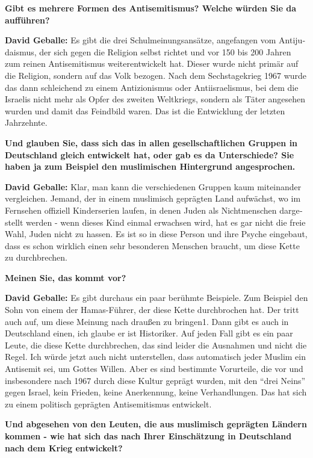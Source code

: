 \begin{otherlanguage}{ngerman}
\textbf{Gibt es mehrere Formen des Antisemitismus? Welche würden Sie da aufführen?}

\textbf{David Geballe:} Es gibt die drei Schulmeinungsansätze, angefangen vom Antijudaismus, der sich gegen die Religion selbst richtet und vor 150 bis 200 Jahren zum reinen Antisemitismus weiterentwickelt hat. Dieser wurde nicht primär auf die Religion, sondern auf das Volk bezogen. Nach dem Sechstagekrieg 1967 wurde das dann schleichend zu einem Antizionismus oder Antiisraelismus, bei dem die Israelis nicht mehr als Opfer des zweiten Weltkriegs, sondern als Täter angesehen wurden und damit das Feindbild waren. Das ist die Entwicklung der letzten Jahrzehnte. 

\textbf{Und glauben Sie, dass sich das in allen gesellschaftlichen Gruppen in Deutschland gleich entwickelt hat, oder gab es da Unterschiede? Sie haben ja zum Beispiel den muslimischen Hintergrund angesprochen.}

\textbf{David Geballe:} Klar, man kann die verschiedenen Gruppen kaum miteinander vergleichen. Jemand, der in einem muslimisch geprägten Land aufwächst, wo im Fernsehen offiziell Kinderserien laufen, in denen Juden als Nichtmenschen dargestellt werden - wenn dieses Kind einmal erwachsen wird, hat es gar nicht die freie Wahl, Juden nicht zu hassen. Es ist so in diese Person und ihre Psyche eingebaut, dass es schon wirklich einen sehr besonderen Menschen braucht, um diese Kette zu durchbrechen. 

\textbf{Meinen Sie, das kommt vor?} 

\textbf{David Geballe:} Es gibt durchaus ein paar berühmte Beispiele. Zum Beispiel den Sohn von einem der Hamas-Führer, der diese Kette durchbrochen hat. Der tritt auch auf, um diese Meinung nach draußen zu bringen1. Dann gibt es auch in Deutschland einen, ich glaube er ist Historiker. Auf jeden Fall gibt es ein paar Leute, die diese Kette durchbrechen, das sind leider die Ausnahmen und nicht die Regel. Ich würde jetzt auch nicht unterstellen, dass automatisch jeder Muslim ein Antisemit sei, um Gottes Willen. Aber es sind bestimmte Vorurteile, die vor und insbesondere nach 1967 durch diese Kultur geprägt wurden, mit den “drei Neins” gegen Israel, kein Frieden, keine Anerkennung, keine Verhandlungen. Das hat sich zu einem politisch geprägten Antisemitismus entwickelt. 

\textbf{Und abgesehen von den Leuten, die aus muslimisch geprägten Ländern kommen - wie hat sich das nach Ihrer Einschätzung in Deutschland nach dem Krieg entwickelt?} 


\end{otherlanguage}
